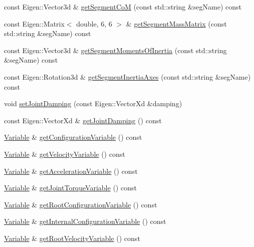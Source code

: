 \begin{DoxyCompactItemize}
\item 
const Eigen\+::\+Vector3d \& \hyperlink{classocra_1_1Model_abfe64304c5b42b875f5b3df252d82619}{get\+Segment\+CoM} (const std\+::string \&seg\+Name) const
\item 
const Eigen\+::\+Matrix$<$ double, 6, 6 $>$ \& \hyperlink{classocra_1_1Model_a6462d992c0da4ca1651478b8007370cc}{get\+Segment\+Mass\+Matrix} (const std\+::string \&seg\+Name) const
\item 
const Eigen\+::\+Vector3d \& \hyperlink{classocra_1_1Model_aadbb1c73724eba41dff3afc805275601}{get\+Segment\+Moments\+Of\+Inertia} (const std\+::string \&seg\+Name) const
\item 
const Eigen\+::\+Rotation3d \& \hyperlink{classocra_1_1Model_a44c8d343bd71f82c9736c40b0e241449}{get\+Segment\+Inertia\+Axes} (const std\+::string \&seg\+Name) const
\item 
void \hyperlink{classocra_1_1Model_a14b26b592ba1fe5d01c2f10120e59bcc}{set\+Joint\+Damping} (const Eigen\+::\+Vector\+Xd \&damping)
\item 
const Eigen\+::\+Vector\+Xd \& \hyperlink{classocra_1_1Model_af2cfdd6af60477289b035fa376ec4058}{get\+Joint\+Damping} () const
\item 
\hyperlink{classocra_1_1Variable}{Variable} \& \hyperlink{classocra_1_1Model_aff63dd9c26f6149f0cdc33a402eca4ea}{get\+Configuration\+Variable} () const
\item 
\hyperlink{classocra_1_1Variable}{Variable} \& \hyperlink{classocra_1_1Model_adceb9df8746c94bd72e1d5035e368eae}{get\+Velocity\+Variable} () const
\item 
\hyperlink{classocra_1_1Variable}{Variable} \& \hyperlink{classocra_1_1Model_adf0c6ffce3a2cc8e3d654bf3d6f23b3c}{get\+Acceleration\+Variable} () const
\item 
\hyperlink{classocra_1_1Variable}{Variable} \& \hyperlink{classocra_1_1Model_aa937c641a2a01e672824a3d4b16f4942}{get\+Joint\+Torque\+Variable} () const
\item 
\hyperlink{classocra_1_1Variable}{Variable} \& \hyperlink{classocra_1_1Model_a68d8c2cf5a411f98e1f624a356b87fba}{get\+Root\+Configuration\+Variable} () const
\item 
\hyperlink{classocra_1_1Variable}{Variable} \& \hyperlink{classocra_1_1Model_a6c660297f1bd8c07c93829fc8a28838a}{get\+Internal\+Configuration\+Variable} () const
\item 
\hyperlink{classocra_1_1Variable}{Variable} \& \hyperlink{classocra_1_1Model_a556fa391a6c5405599d23ee83d4b4787}{get\+Root\+Velocity\+Variable} () const

\end{DoxyCompactItemize}

